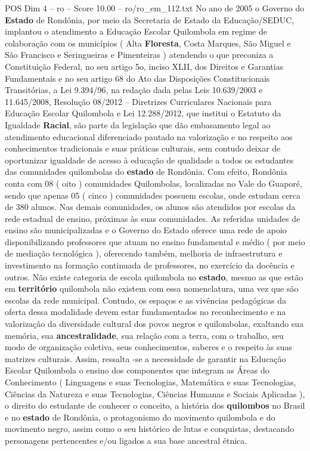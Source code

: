 \begin{textsample}{POS Dim 4 – ro – Score 10.00 – ro/ro\_em\_112.txt}
No ano de 2005 o Governo do \textbf{Estado} de Rondônia, por meio da Secretaria de Estado da Educação/SEDUC, implantou o atendimento a Educação Escolar Quilombola em regime de colaboração com os municípios ( Alta \textbf{Floresta}, Costa Marques, São Miguel e São Francisco e Seringueiras e Pimenteiras ) atendendo o que preconiza a Constituição Federal, no seu artigo 5o, inciso XLII, dos Direitos e Garantias Fundamentais e no seu artigo 68 do Ato das Disposições Constitucionais Transitórias, a Lei 9.394/96, na redação dada pelas Leis 10.639/2003 e 11.645/2008, Resolução 08/2012 – Diretrizes Curriculares Nacionais para Educação Escolar Quilombola e Lei 12.288/2012, que institui o Estatuto da Igualdade \textbf{Racial}, são parte da legislação que dão embasamento legal ao atendimento educacional diferenciado pautado na valorização e no respeito aos conhecimentos tradicionais e suas práticas culturais, sem contudo deixar de oportunizar igualdade de acesso à educação de qualidade a todos os estudantes das comunidades quilombolas do \textbf{estado} de Rondônia.
Com efeito, Rondônia conta com 08 ( oito ) comunidades Quilombolas, localizadas no Vale do Guaporé, sendo que apenas 05 ( cinco ) comunidades possuem escolas, onde estudam cerca de 380 alunos.
Nas demais comunidades, os alunos são atendidos por escolas da rede estadual de ensino, próximas às suas comunidades.
As referidas unidades de ensino são municipalizadas e o Governo do Estado oferece uma rede de apoio disponibilizando professores que atuam no ensino fundamental e médio ( por meio de mediação tecnológica ), oferecendo também, melhoria de infraestrutura e investimento na formação continuada de professores, no exercício da docência e outros.
Não existe categoria de escola quilombola no \textbf{estado}, mesmo as que estão em \textbf{território} quilombola não existem com essa nomenclatura, uma vez que são escolas da rede municipal.
Contudo, os espaços e as vivências pedagógicas da oferta dessa modalidade devem estar fundamentados no reconhecimento e na valorização da diversidade cultural dos povos negros e quilombolas, exaltando sua memória, sua \textbf{ancestralidade}, sua relação com a terra, com o trabalho, seu modo de organização coletiva, seus conhecimentos, saberes e o respeito às suas matrizes culturais.
Assim, ressalta -se a necessidade de garantir na Educação Escolar Quilombola o ensino dos componentes que integram as Áreas do Conhecimento ( Linguagens e suas Tecnologias, Matemática e suas Tecnologias, Ciências da Natureza e suas Tecnologias, Ciências Humanas e Sociais Aplicadas ), o direito do estudante de conhecer o conceito, a história dos \textbf{quilombos} no Brasil e no \textbf{estado} de Rondônia, o protagonismo do movimento quilombola e do movimento negro, assim como o seu histórico de lutas e conquistas, destacando personagens pertencentes e/ou ligados a sua base ancestral étnica.

\end{textsample}
